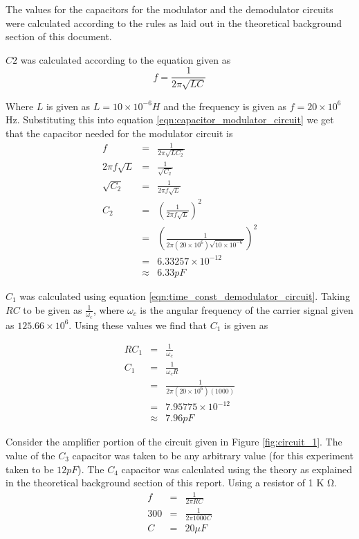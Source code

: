 \documentclass[12pt, a4paper]{article}
\begin{document}
	The values for the capacitors for the modulator and the demodulator circuits were calculated according to the rules as laid out in the theoretical background section of this document.

	$C2$ was calculated according to the equation given as 
	\begin{equation}
		f =  \frac{1}{2\pi\sqrt{LC}} 
		\label{eqn:capacitor_modulator_circuit}
	\end{equation}

	Where $L$ is given as $L = 10\times10^{-6}H$ and the frequency is given as $f= 20\times 10^6 $Hz. Substituting this into equation \ref{eqn:capacitor_modulator_circuit} we get that the capacitor needed for the modulator circuit is
	\[
		\begin{array}{rcl}
			f & = & \frac{1}{2\pi\sqrt{LC_2}} \\
			2\pi f \sqrt{L} & = & \frac{1}{\sqrt{C_2}} \\
			\sqrt{C_2} & = & \frac{1}{2\pi f \sqrt{L}} \\
			C_2 & = & \left(\frac{1}{2\pi f \sqrt{L}}\right)^2 \\
			& = & \left(\frac{1}{2\pi(20\times 10^6)\sqrt{10\times 10^{-6}}}\right)^2 \\
			& = & 6.33257 \times 10^{-12} \\
			& \approx & 6.33 pF 
		\end{array}
	\]
	

	$C_1$ was calculated using equation \ref{eqn:time_const_demodulator_circuit}. Taking $RC$ to be given as $\frac{1}{\omega_c}$, where $\omega_c$ is the angular frequency of the carrier signal given as $125.66 \times 10^6 $. Using these values we find that $C_1$ is given as

	\[
		\begin{array}{rcl}
			RC_1 & = & \frac{1}{\omega_c} \\
			C_1 & = & \frac{1}{\omega_c R} \\
			& = & \frac{1}{2\pi (20\times 10^6)(1000)} \\
			& = & 7.95775 \times 10^{-12} \\
			& \approx & 7.96 pF
		\end{array}
	\]

	Consider the amplifier portion of the circuit given in Figure \ref{fig:circuit_1}. The value of the $C_3$ capacitor was taken to be any arbitrary value (for this experiment taken to be $12 pF$). The $C_4$ capacitor was calculated using the theory as explained in the theoretical background section of this report. Using a resistor of 1 K \si{\ohm}. 
	\[
		\begin{array}{rcl}
			f &= & \frac{1}{2\pi RC} \\
			300 &=& \frac{1}{2\pi 1000C} \\
			C &=& 20 \mu F \\
		\end{array}
	\]
\end{document}

